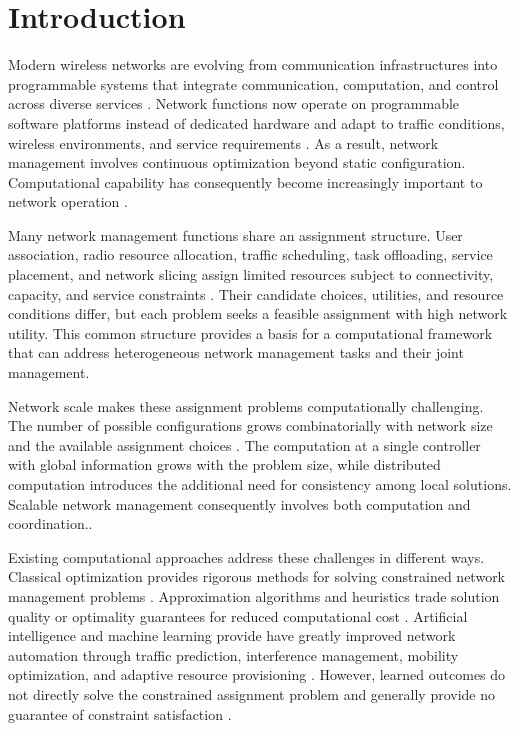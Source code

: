 \documentclass[journal]{IEEEtran}
\begin{document}
{{\section{Introduction}
\label{sec:intro}
Modern wireless networks are evolving from communication infrastructures into programmable systems that integrate communication, computation, and control across diverse services \cite{jang2025cqf}. Network functions now operate on programmable software platforms instead of dedicated hardware and adapt to traffic conditions, wireless environments, and service requirements \cite{lee2024node,masaracchia2023dt}. As a result, network management
involves continuous optimization beyond static configuration. Computational capability has consequently become increasingly important to network operation \cite{lee2024node,wang2022quantum6g}.

Many network management functions share an assignment structure. User association, radio resource allocation, traffic scheduling, task offloading, service placement, and network slicing assign limited resources subject to connectivity, capacity, and service constraints \cite{yi2025towards,chowdhary2022intent}. Their candidate choices,
utilities, and resource conditions differ, but each problem seeks a feasible assignment with high network utility. This common structure provides a basis for a computational framework that can address heterogeneous network management tasks and their joint management.

Network scale makes these assignment problems computationally challenging. The number of possible configurations grows combinatorially with network size and the available assignment choices \cite{yi2025towards}. The computation at a single controller with global information grows with the problem size, while distributed computation introduces the additional need for consistency among local solutions. Scalable network management consequently involves both computation and coordination..

Existing computational approaches address these challenges in different ways. Classical optimization provides rigorous methods for solving constrained network management problems \cite{brassard2002,farhi2014}. Approximation algorithms and heuristics trade solution quality or optimality guarantees for reduced computational cost
\cite{farhi2014,lucas2014}. Artificial intelligence and machine learning provide have greatly improved network automation through traffic prediction, interference management, mobility optimization, and adaptive resource provisioning \cite{lee2024node}. However, learned outcomes do not directly solve the constrained assignment problem and generally provide no guarantee of constraint satisfaction \cite{botsinis2019}.

}}
\end{document}
